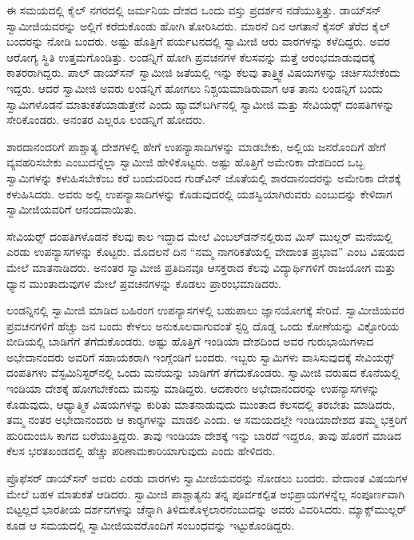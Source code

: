  ಈ ಸಮಯದಲ್ಲಿ ಕೈಲ್ ನಗರದಲ್ಲಿ ಜರ್ಮನಿಯ ದೇಶದ ಒಂದು ವಸ್ತು ಪ್ರದರ್ಶನ ನಡೆಯುತ್ತಿತ್ತು. ಡಾಯ್‍ಸನ್‍ ಸ್ವಾಮೀಜಿಯವರನ್ನು ಅಲ್ಲಿಗೆ ಕರೆದುಕೊಂಡು ಹೋಗಿ ತೋರಿಸಿದರು. ಮಾರನೆ ದಿನ ಆಗತಾನೆ ಕೈಸರ್ ತೆರೆದ ಕೈಲ್ ಬಂದರನ್ನು ನೋಡಿ ಬಂದರು. ಅಷ್ಟು ಹೊತ್ತಿಗೆ ಪರ್ಯಟನದಲ್ಲಿ ಸ್ವಾಮೀಜಿ ಆರು ವಾರಗಳನ್ನು ಕಳೆದಿದ್ದರು. ಅವರ ಆರೋಗ್ಯ ಸ್ಥಿತಿ ಉತ್ತಮಗೊಂಡಿತ್ತು. ಲಂಡನ್ನಿಗೆ ಹೋಗಿ ಪ್ರವಚನಗಳ ಕೆಲಸವನ್ನು ಮತ್ತೆ ಆರಂಭಮಾಡುವುದಕ್ಕೆ ಕಾತರರಾಗಿದ್ದರು. ಪಾಲ್ ಡಾಯ್‍ಸನ್‍ ಸ್ವಾಮೀಜಿ ಜತೆಯಲ್ಲಿ ಇನ್ನು ಕೆಲವು ತಾತ್ತ್ವಿಕ ವಿಷಯಗಳನ್ನು ಚರ್ಚಿಸಬೇಕೆಂದು ಇದ್ದರು. ಆದರೆ ಸ್ವಾಮೀಜಿ ಅವರು ಲಂಡನ್ನಿಗೆ ಹೋಗಲು ನಿಶ್ಚಯಮಾಡಿರುವಾಗ ಆತ ತಾನು ಲಂಡನ್ನಿಗೆ ಬಂದು ಸ್ವಾಮಿಗಳೊಡನೆ ಮಾತುಕತೆಯಾಡುತ್ತೇನೆ ಎಂದು ಹ್ಯಾಮ್‍ಬರ್ಗಿನಲ್ಲಿ ಸ್ವಾಮೀಜಿ ಮತ್ತು ಸೇವಿಯರ್ಸ್‍‍ ದಂಪತಿಗಳನ್ನು ಸೇರಿಕೊಂಡರು. ಅನಂತರ ಎಲ್ಲರೂ ಲಂಡನ್ನಿಗೆ ಹೋದರು. 

 ಶಾರದಾನಂದರಿಗೆ ಪಾಶ್ಚಾತ್ಯ ದೇಶಗಳಲ್ಲಿ ಹೇಗೆ ಉಪನ್ಯಾಸಾದಿಗಳನ್ನು ಮಾಡಬೇಕು, ಅಲ್ಲಿಯ ಜನರೊಂದಿಗೆ ಹೇಗೆ ವ್ಯವಹರಿಸಬೇಕು ಎಂಬುದನ್ನೆಲ್ಲಾ ಸ್ವಾಮೀಜಿ ಹೇಳಿಕೊಟ್ಟರು. ಅಷ್ಟು ಹೊತ್ತಿಗೆ ಅಮೇರಿಕಾ ದೇಶದಿಂದ ಒಬ್ಬ ಸ್ವಾಮಿಗಳನ್ನು ಕಳುಹಿಸಬೇಕೆಂಬ ಕರೆ ಬಂದುದರಿಂದ ಗುಡ್‍ವಿನ್ ಜೊತೆಯಲ್ಲಿ ಶಾರದಾನಂದರನ್ನು ಅಮೇರಿಕಾ ದೇಶಕ್ಕೆ ಕಳುಹಿಸಿದರು. ಅವರು ಅಲ್ಲಿ ಉಪನ್ಯಾಸಾದಿಗಳನ್ನು ಕೊಡುವುದರಲ್ಲಿ ಯಶಸ್ವಿಯಾಗಿರುವರು ಎಂಬುದನ್ನು ಕೇಳಿದಾಗ ಸ್ವಾಮೀಜಿಯವರಿಗೆ ಆನಂದವಾಯಿತು. 

 ಸೇವಿಯರ್ಸ್‍‍ ದಂಪತಿಗಳೊಡನೆ ಕೆಲವು ಕಾಲ ಇದ್ದಾದ ಮೇಲೆ ವಿಂಬಲ್‍ಡನ್‍ನಲ್ಲಿರುವ ಮಿಸ್ ಮುಲ್ಲರ್ ಮನೆಯಲ್ಲಿ ಎರಡು ಉಪನ್ಯಾಸಗಳನ್ನು ಕೊಟ್ಟರು. ಮೊದಲನೆ ದಿನ “ನಮ್ಮ ನಾಗರಿಕತೆಯಲ್ಲಿ ವೇದಾಂತ ಪ್ರಭಾವ” ಎಂಬ ವಿಷಯದ ಮೇಲೆ ಮಾತನಾಡಿದರು. ಅನಂತರ ಸ್ವಾಮೀಜಿ ಪ್ರತಿದಿನವೂ ಆಸಕ್ತರಾದ ಕೆಲವು ವಿದ್ಯಾರ್ಥಿಗಳಿಗೆ ರಾಜಯೋಗ ಮತ್ತು ಧ್ಯಾನ ಮುಂತಾದುವುಗಳ ಮೇಲೆ ಪ್ರವಚನಗಳನ್ನು ಕೊಡಲು ಪ್ರಾರಂಭಮಾಡಿದರು. 

 ಲಂಡನ್ನಿನಲ್ಲಿ ಸ್ವಾಮೀಜಿ ಮಾಡಿದ ಬಹಿರಂಗ ಉಪನ್ಯಾಸಗಳಲ್ಲಿ ಬಹುಪಾಲು ಜ್ಞಾನಯೋಗಕ್ಕೆ ಸೇರಿವೆ. ಸ್ವಾಮೀಜಿಯವರ ಪ್ರವಚನಗಳಿಗೆ ಹೆಚ್ಚು ಜನ ಬಂದು ಕೇಳಲು ಅನುಕೂಲವಾಗುವಂತೆ ಸ್ಟರ‍್ಡಿ ದೊಡ್ಡ ಒಂದು ಕೋಣೆಯನ್ನು ವಿಕ್ಟೋರಿಯ ಬೀದಿಯಲ್ಲಿ ಬಾಡಿಗೆಗೆ ತೆಗೆದುಕೊಂಡರು. ಅಷ್ಟು ಹೊತ್ತಿಗೆ ಇಂಡಿಯಾ ದೇಶದಿಂದ ಅವರ ಗುರುಭಾಯಿಗಳಾದ ಅಭೇದಾನಂದರು ಅವರಿಗೆ ಸಹಾಯಕರಾಗಿ ಇಂಗ್ಲೆಂಡಿಗೆ ಬಂದರು. ಇಬ್ಬರು ಸ್ವಾಮಿಗಳು ವಾಸಿಸುವುದಕ್ಕೆ ಸೇವಿಯರ್ಸ್‍‍ ದಂಪತಿಗಳು ವೆಸ್ಟಮಿನಿಸ್ಟರ್‌ನಲ್ಲಿ ಒಂದು ಮನೆಯನ್ನು ಬಾಡಿಗೆಗೆ ತೆಗೆದುಕೊಂಡರು. ಸ್ವಾಮೀಜಿ ವರುಷದ ಕೊನೆಯಲ್ಲಿ ಇಂಡಿಯಾ ದೇಶಕ್ಕೆ ಹೋಗಬೇಕೆಂದು ಮನಸ್ಸು ಮಾಡಿದ್ದರು. ಆದಕಾರಣ ಅಭೇದಾನಂದರನ್ನು ಉಪನ್ಯಾಸಗಳನ್ನು ಕೊಡುವುದು, ಆಧ್ಯಾತ್ಮಿಕ ವಿಷಯಗಳನ್ನು ಕುರಿತು ಮಾತನಾಡುವುದು ಮುಂತಾದ ಕೆಲಸದಲ್ಲಿ ತರಬೇತು ಮಾಡಿದರು, ತಮ್ಮ ನಂತರ ಅಭೇದಾನಂದರು ಆ ಕಾರ‍್ಯಗಳನ್ನು ಮಾಡಲಿ ಎಂದು. ಆ ಸಮಯದಲ್ಲೇ ಇಂಡಿಯಾದೇಶದ ತಮ್ಮ ಭಕ್ತರಿಗೆ ಹುರಿದುಂಬಿಸಿ ಕಾಗದ ಬರೆಯುತ್ತಿದ್ದರು. ತಾವು ಇಂಡಿಯಾ ದೇಶಕ್ಕೆ ಇನ್ನು ಬಾರದೆ ಇದ್ದರೂ, ತಾವು ಹೊರಗೆ ಮಾಡಿದ ಕೆಲಸ ಭರತಖಂಡದಲ್ಲಿ ಹೆಚ್ಚು ಪರಿಣಾಮಕಾರಿಯಾಗುವುದು ಎಂದು ಹೇಳಿದರು. 

 ಪ್ರೊಫೆಸರ್ ಡಾಯ್‍ಸನ್‍ ಅವರು ಎರಡು ವಾರಗಳು ಸ್ವಾಮೀಜಿಯವರನ್ನು ನೋಡಲು ಬಂದರು. ವೇದಾಂತ ವಿಷಯಗಳ ಮೇಲೆ ಬಹಳ ಮಾತುಕತೆ ಆಡಿದರು. ಸ್ವಾಮೀಜಿ ಪಾಶ್ಚಾತ್ಯನು ತನ್ನ ಪೂರ್ವಕಲ್ಪಿತ ಅಭಿಪ್ರಾಯಗಳನ್ನೆಲ್ಲ ಸಂಪೂರ್ಣವಾಗಿ ಬಿಟ್ಟಲ್ಲದೆ ಭಾರತೀಯ ದರ್ಶನಗಳನ್ನು ಚೆನ್ನಾಗಿ ತಿಳಿದುಕೊಳ್ಳಲಾರನೆಂಬುದನ್ನು ಅವರು ವಿವರಿಸಿದರು. ಮ್ಯಾಕ್ಸ್‌ಮುಲ್ಲರ್ ಕೂಡ ಆ ಸಮಯದಲ್ಲಿ ಸ್ವಾಮೀಜಿಯವರೊಂದಿಗೆ ಸಂಬಂಧವನ್ನು ಇಟ್ಟುಕೊಂಡಿದ್ದರು. 

